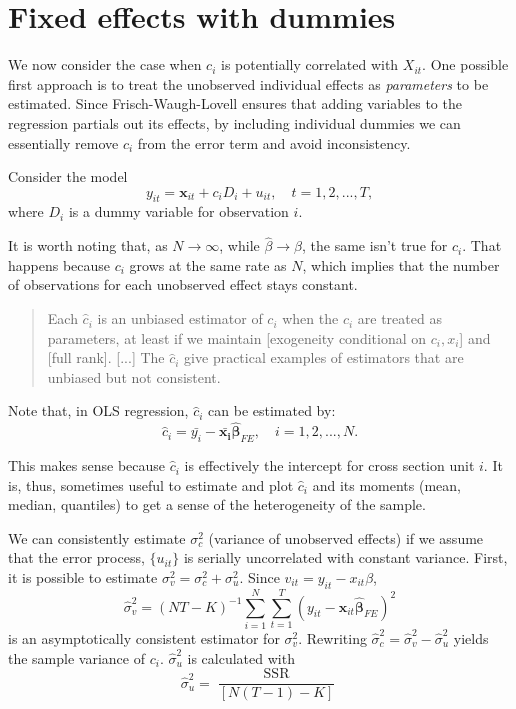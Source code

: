 \documentclass[11pt, a4paper]{report}
\theoremstyle{plain}
\theoremstyle{plain}
\theoremstyle{remark}
\begin{document}
\section{Fixed effects with dummies}

We now consider the case when $c_i$ is potentially correlated with $X_{it}$. One possible first approach is to treat the unobserved individual effects as \textit{parameters} to be estimated. Since Frisch-Waugh-Lovell ensures that adding variables to the regression partials out its effects, by including individual dummies we can essentially remove $c_i$ from the error term and avoid inconsistency.

Consider the model
\begin{equation}
    y_{i t}=\mathbf{x}_{i t} + 
    c_i D_i + u_{it}, \quad t = 1,2,..., T,
\end{equation}
where $D_i$ is a dummy variable for observation $i$.

It is worth noting that, as $N \to \infty$, while $\hat{\beta} \to \beta$, the same isn't true for $c_i$. That happens because $c_i$ grows at the same rate as $N$, which implies that the number of observations for each unobserved effect stays constant. 
\begin{quote}
    Each $\hat{c}_i$ is an unbiased estimator of $c_i$ when the $c_i$ are treated as parameters, at least if we maintain [exogeneity conditional on $c_i, x_i$] and [full rank]. [...] The $\hat{c}_i$ give practical examples of estimators that are unbiased but not consistent. 
\end{quote}

Note that, in OLS regression, $\hat{c}_i$ can be estimated by:
\begin{equation}
    \hat{c}_i = \bar{y_i} - \bar{\mathbf{x_i}}\hat{\mathbf{\beta}}_{FE}, \quad i = 1,2,..., N.
\end{equation}

This makes sense because $\hat{c}_i$ is effectively the intercept for cross section unit $i$. It is, thus, sometimes useful to estimate and plot $\hat{c}_i$ and its moments (mean, median, quantiles) to get a sense of the heterogeneity of the sample. 

We can consistently estimate $\sigma^2_c$ (variance of unobserved effects) if we assume that the error process, $\{u_{it}\}$ is serially uncorrelated with constant variance. First, it is possible to estimate $\sigma_v^2 = \sigma_c^2 + \sigma_u^2$. Since $v_{it} = y_{it} - x_{it}\beta$,
\begin{equation}
    \hat{\sigma}_{v}^{2}=(N T-K)^{-1} \sum_{i=1}^{N} \sum_{t=1}^{T}\left(y_{i t}-\mathbf{x}_{i t} \hat{\boldsymbol{\beta}}_{F E}\right)^{2}
    \end{equation}
is an asymptotically consistent estimator for $\sigma_v^2$. Rewriting $\hat{\sigma}^2_c = \hat{\sigma}^2_v - \hat{\sigma}^2_u$ yields the sample variance of $c_i$. $\hat{\sigma}^2_u$ is calculated with
\begin{equation}
    \hat{\sigma}_{u}^{2}=\dfrac{\operatorname{SSR}}{[N(T-1)-K]}
\end{equation}
\end{document}
